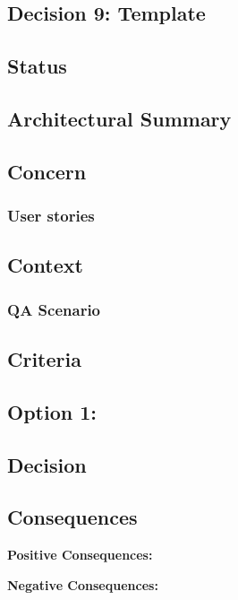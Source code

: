 \subsection{Decision 9: Template}

\subsection*{Status}

\subsection*{Architectural Summary}


\subsection*{Concern}
\subsubsection*{User stories}

\subsection*{Context}
\subsubsection*{QA Scenario} %
\subsection*{Criteria}
\begin{itemize}
\end{itemize}

\subsection*{Option 1: }

\subsection*{Decision}

\subsection*{Consequences}
\textbf{Positive Consequences:}
\begin{itemize}
\end{itemize}
\textbf{Negative Consequences:}
\begin{itemize}
\end{itemize}
